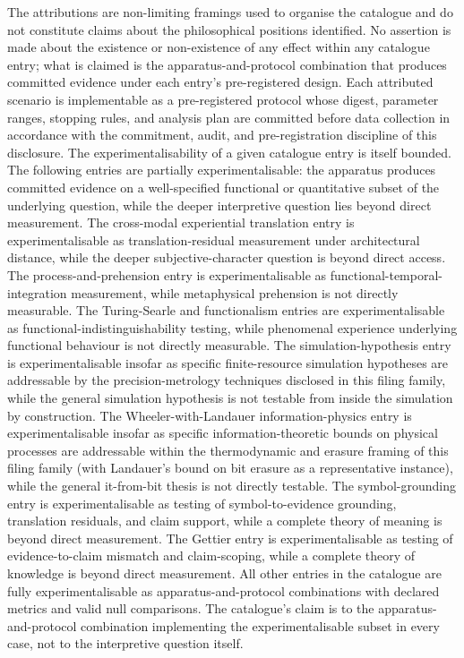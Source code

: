 \documentclass[a4paper,12pt]{article}
\begin{document}
The attributions are non-limiting framings used to organise the
catalogue and do not constitute claims about the philosophical
positions identified. No assertion is made about the existence or
non-existence of any effect within any catalogue entry; what is
claimed is the apparatus-and-protocol combination that produces
committed evidence under each entry's pre-registered design. Each
attributed scenario is implementable as a pre-registered protocol
whose digest, parameter ranges, stopping rules, and analysis plan
are committed before data collection in accordance with the
commitment, audit, and pre-registration discipline of this
disclosure. The experimentalisability of a given catalogue entry
is itself bounded. The following entries are partially
experimentalisable: the apparatus produces committed evidence on a
well-specified functional or quantitative subset of the underlying
question, while the deeper interpretive question lies beyond
direct measurement. The cross-modal experiential translation
entry is experimentalisable as translation-residual measurement
under architectural distance, while the deeper subjective-character
question is beyond direct access. The process-and-prehension entry
is experimentalisable as functional-temporal-integration
measurement, while metaphysical prehension is not directly
measurable. The Turing-Searle and functionalism entries are
experimentalisable as functional-indistinguishability testing,
while phenomenal experience underlying functional behaviour is
not directly measurable. The simulation-hypothesis entry is
experimentalisable insofar as specific finite-resource simulation
hypotheses are addressable by the precision-metrology techniques
disclosed in this filing family, while the general simulation
hypothesis is not testable from inside the simulation by
construction. The Wheeler-with-Landauer information-physics entry
is experimentalisable insofar as specific information-theoretic
bounds on physical processes are addressable within the
thermodynamic and erasure framing of this filing family (with
Landauer's bound on bit erasure as a representative instance),
while the general it-from-bit thesis is not directly testable.
The symbol-grounding entry is experimentalisable as testing of
symbol-to-evidence grounding, translation residuals, and claim
support, while a complete theory of meaning is beyond direct
measurement. The Gettier entry is experimentalisable as testing
of evidence-to-claim mismatch and claim-scoping, while a complete
theory of knowledge is beyond direct measurement. All other
entries in the catalogue are fully experimentalisable as
apparatus-and-protocol combinations with declared metrics and
valid null comparisons. The catalogue's claim is to the
apparatus-and-protocol combination implementing the
experimentalisable subset in every case, not to the interpretive
question itself.
\end{document}
